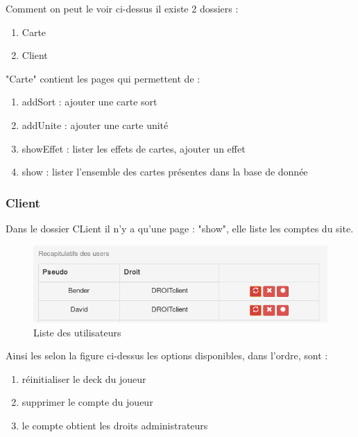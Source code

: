 \documentclass[a4paper, titlepage]{livret}
\begin{document}
	Comment on peut le voir ci-dessus il existe 2 dossiers :
	\begin{enumerate}
		\item Carte
		\item Client
	\end{enumerate}

	"Carte" contient les pages qui permettent de :
	\begin{enumerate}
		\item addSort : ajouter une carte sort
		\item addUnite : ajouter une carte unité
		\item showEffet : lister les effets de cartes, ajouter un effet
		\item show : lister l'ensemble des cartes présentes dans la base de donnée
	\end{enumerate}

        \subsubsection{Client}
         Dans le dossier CLient il n'y a qu'une page : "show", elle liste les comptes du site. 
        \begin{figure}[th]
      		\begin{center}
        	\includegraphics[scale=0.4]{Assets/liste_user.png}
        	\caption{Liste des utilisateurs}
        	\label{fig5}
      		\end{center}
    	\end{figure}

	Ainsi les selon la figure ci-dessus les options disponibles, dans l'ordre, sont : 
	\begin{enumerate}
		\item réinitialiser le deck du joueur
		\item supprimer le compte du joueur
		\item le compte obtient les droits administrateurs
	\end{enumerate}
         
\end{document}
